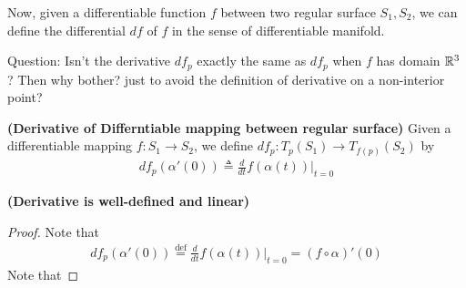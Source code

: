 \documentclass{report}
\begin{document}
\begin{mdframed}
Now, given a differentiable function $f$ between two regular surface $S_1,S_2$, we can define the differential $df$ of $f$ in the sense of differentiable manifold.
\end{mdframed}
\begin{mdframed}
Question: Isn't the derivative $df_p$ exactly the same as  $df_p$ when  $f$ has domain  $\mathbb{R}^3$? Then why bother? just to avoid the definition of derivative on a non-interior point? 
\end{mdframed}
\begin{definition}
\textbf{(Derivative of Differntiable mapping between regular surface)} Given a differentiable mapping $f:S_1\rightarrow S_2$, we define $df_p:T_p(S_1)\to T_{f(p)}(S_2)$ by 
\begin{align*}
df_p(\alpha '(0))\triangleq \frac{d}{dt}f(\alpha (t))|_{t=0}
\end{align*}
\end{definition}
\begin{theorem}
\textbf{(Derivative is well-defined and linear)}
\end{theorem}
\begin{proof}
Note that 
\begin{align*}
df_p(\alpha '(0))\overset{\text{def}}{=}\frac{d}{dt}f(\alpha (t))|_{t=0}=(f\circ \alpha )'(0)
\end{align*}
Note that 
\end{proof}
\end{document}
